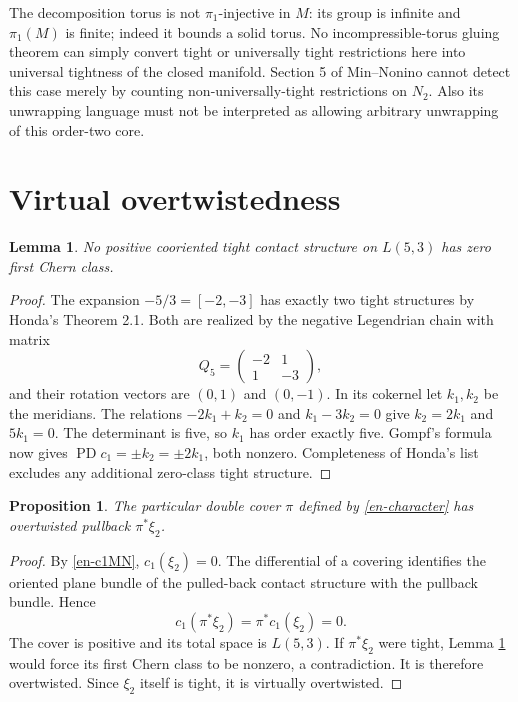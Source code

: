 \documentclass[12pt]{amsart}
\newtheorem{prop}[thm]{Proposition}
\newtheorem{lem}[thm]{Lemma}
\theoremstyle{definition}
\theoremstyle{remark}
\numberwithin{equation}{section}
\theoremstyle{definition}
\begin{document}
The decomposition torus is not $\pi_1$-injective in $M$: its group is infinite and $\pi_1(M)$ is finite; indeed it bounds a solid torus. No incompressible-torus gluing theorem can simply convert tight or universally tight restrictions here into universal tightness of the closed manifold. Section 5 of Min--Nonino cannot detect this case merely by counting non-universally-tight restrictions on $N_2$. Also its unwrapping language must not be interpreted as allowing arbitrary unwrapping of this order-two core.

\section{Virtual overtwistedness}\label{en-vot}
\begin{lem}\label{en-upstairs}
No positive cooriented tight contact structure on $L(5,3)$ has zero first Chern class.
\end{lem}
\begin{proof}
The expansion $-5/3=[-2,-3]$ has exactly two tight structures by Honda's Theorem 2.1. Both are realized by the negative Legendrian chain with matrix
\[
Q_5=\begin{pmatrix}-2&1\\1&-3\end{pmatrix},
\]
and their rotation vectors are $(0,1)$ and $(0,-1)$. In its cokernel let $k_1,k_2$ be the meridians. The relations $-2k_1+k_2=0$ and $k_1-3k_2=0$ give $k_2=2k_1$ and $5k_1=0$. The determinant is five, so $k_1$ has order exactly five. Gompf's formula now gives $\operatorname{PD}c_1=\pm k_2=\pm2k_1$, both nonzero. Completeness of Honda's list excludes any additional zero-class tight structure.
\end{proof}

\begin{prop}\label{en-doubleOT}
The particular double cover $\pi$ defined by \eqref{en-character} has overtwisted pullback $\pi^*\xi_2$.
\end{prop}
\begin{proof}
By \eqref{en-c1MN}, $c_1(\xi_2)=0$. The differential of a covering identifies the oriented plane bundle of the pulled-back contact structure with the pullback bundle. Hence
\[
c_1(\pi^*\xi_2)=\pi^*c_1(\xi_2)=0.
\]
The cover is positive and its total space is $L(5,3)$. If $\pi^*\xi_2$ were tight, Lemma \ref{en-upstairs} would force its first Chern class to be nonzero, a contradiction. It is therefore overtwisted. Since $\xi_2$ itself is tight, it is virtually overtwisted.
\end{proof}
\end{document}
